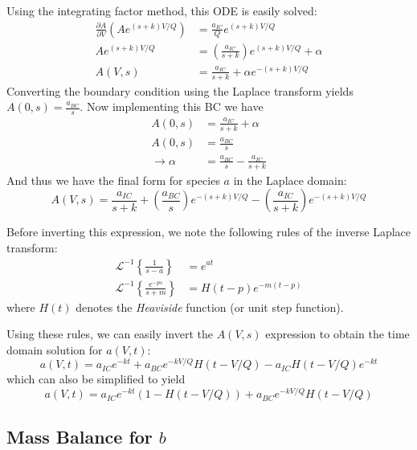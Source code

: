 \documentclass[a4paper,12pt]{article}
\begin{document}
Using the integrating factor method, this ODE is easily solved:
\begin{align}
	\frac{\partial A}{\partial V}\left( Ae^{(s+k)V/Q} \right) &= \frac{a_{IC}}{Q} e^{(s+k)V/Q}\\
	Ae^{(s+k)V/Q} &= \left( \frac{a_{IC}}{s+k}\right)e^{(s+k)V/Q}  + \alpha\\
	A(V, s) &= \frac{a_{IC}}{s+k} + \alpha e^{-(s+k)V/Q}
\end{align}
Converting the boundary condition using the Laplace transform yields $ A(0, s) = \frac{a_{BC}}{s} $.
Now implementing this BC we have 
\begin{align}
	A(0, s) &= \frac{a_{IC}}{s+k} + \alpha \\
	A(0, s) &= \frac{a_{BC}}{s} \\
	\rightarrow \alpha &= \frac{a_{BC}}{s} - \frac{a_{IC}}{s+k}
\end{align}
And thus we have the final form for species $a$ in the Laplace domain:
\begin{equation}
	A(V, s) = \frac{a_{IC}}{s+k} + \left( \frac{a_{BC}}{s} \right)e^{-(s+k)V/Q} - 
			\left( \frac{a_{IC}}{s+k} \right)e^{-(s+k)V/Q}
\end{equation}

Before inverting this expression, we note the following rules of the inverse Laplace transform:
\begin{align}
	\mathscr{L}^{-1} \left\{ \frac{1}{s-a} \right\} &= e^{at} \\
	\mathscr{L}^{-1} \left\{ \frac{e^{-ps}}{s+m} \right\} &= H(t-p) e^{-m(t-p)}
\end{align}
where $H(t)$ denotes the \emph{Heaviside} function (or unit step function).

Using these rules, we can easily invert the $A(V, s)$ expression to obtain the time domain solution for $a(V,t)$:
\begin{equation}
	a(V, t) = a_{IC} e^{-kt} + a_{BC}e^{-kV/Q}H(t-V/Q) - a_{IC} H(t-V/Q) e^{-kt}
\end{equation}
which can also be simplified to yield
\begin{equation}
	a(V, t) = a_{IC} e^{-kt}(1-H(t-V/Q)) + a_{BC}e^{-kV/Q}H(t-V/Q)
\end{equation}

\subsection{Mass Balance for $b$}
\end{document}
